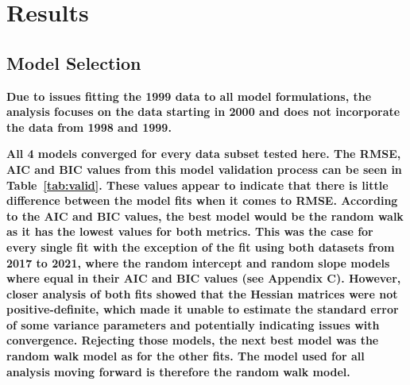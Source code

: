\documentclass[12pt]{article}\usepackage[]{graphicx}\usepackage[]{color}
\begin{document}
\hypertarget{results}{%
\section{Results}\label{results}}

\hypertarget{model-selection}{%
\subsection{\texorpdfstring{Model \textbf{Selection}}{Model Selection}}\label{model-selection}}

\textbf{Due to issues fitting the 1999 data to all model formulations, the analysis focuses on the data starting in 2000 and does not incorporate the data from 1998 and 1999.}

\textbf{All 4 models converged for every data subset tested here. The RMSE, AIC and BIC values from this model validation process can be seen in Table~\ref{tab:valid}. These values appear to indicate that there is little difference between the model fits when it comes to RMSE. According to the AIC and BIC values, the best model would be the random walk as it has the lowest values for both metrics. This was the case for every single fit with the exception of the fit using both datasets from 2017 to 2021, where the random intercept and random slope models where equal in their AIC and BIC values (see Appendix C). However, closer analysis of both fits showed that the Hessian matrices were not positive-definite, which made it unable to estimate the standard error of some variance parameters and potentially indicating issues with convergence. Rejecting those models, the next best model was the random walk model as for the other fits. The model used for all analysis moving forward is therefore the random walk model.}
\end{document}
